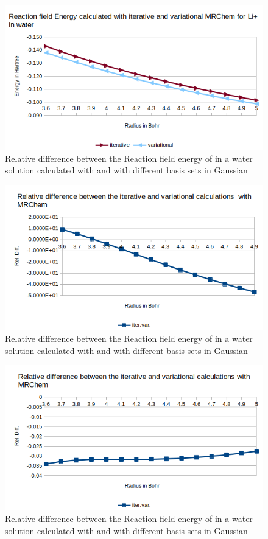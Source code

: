 \documentclass[../master_thesis.tex]{subfiles}
\begin{document}
\begin{figure}[h!]
  \centering
  \includegraphics[width=0.75\linewidth]{img/lipvarEr.png}
  \caption{Relative difference between the Reaction field energy of  in a water solution calculated with \mrchem
  and with different basis sets in Gaussian}
  \label{fig:lipvarEr}
\end{figure}

\begin{figure}[h!]
  \centering
    \includegraphics[width=\linewidth]{img/watitervarreldiff.png}
  \caption{Relative difference between the Reaction field energy of  in a water solution calculated with \mrchem
  and with different basis sets in Gaussian}
  \label{fig:watreldiffvardaug}
\end{figure}

\begin{figure}[h!]
  \centering
    \includegraphics[width=\linewidth]{img/lipitervarreldiff.png}
  \caption{Relative difference between the Reaction field energy of  in a water solution calculated with \mrchem
  and with different basis sets in Gaussian}
  \label{fig:lipreldiffvardaug}
\end{figure}
\end{document}
